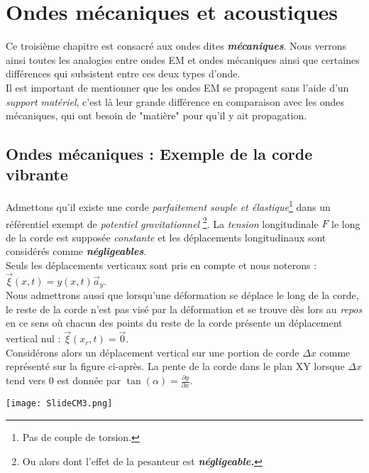 \chapter{Ondes mécaniques et acoustiques} 

Ce troisième chapitre est consacré aux ondes dites \textit{\textbf{mécaniques}}. Nous verrons ainsi toutes les analogies entre ondes EM et ondes mécaniques ainsi que certaines différences qui subsistent entre ces deux types d'onde. \\ 

Il est important de mentionner que les ondes EM se propagent sans l'aide d'un \textit{support matériel}, c'est là leur grande différence en comparaison avec les ondes mécaniques, qui ont besoin de "matière" pour qu'il y ait propagation. 

\section{Ondes mécaniques : Exemple de la corde vibrante}

Admettons qu'il existe une corde \textit{parfaitement souple et élastique}\footnote{Pas de couple de torsion.} dans un référentiel exempt de \textit{potentiel gravitationnel} \footnote{Ou alors dont l'effet de la pesanteur est \textit{\textbf{négligeable.}}}. La \textit{tension} longitudinale $F$ le long de la corde est supposée \textit{constante} et les déplacements longitudinaux sont considérés comme \textit{\textbf{négligeables}}. \\Seuls les déplacements verticaux sont pris en compte et nous noterons : $\vec{\xi}(x,t) = y(x,t) \vec{a}_{y}$.
\\
Nous admettrons aussi que lorsqu'une déformation se déplace le long de la corde, le reste de la corde n'est pas visé par la déformation et se trouve dès lors au \textit{repos} en ce sens où chacun des points du reste de la corde présente un déplacement vertical nul : $\vec{\xi}(x_{r},t) = \vec{0}$. \\

Considérons alors un déplacement vertical sur une portion de corde $\Delta x$ comme représenté sur la figure ci-après.  La pente de la corde dans le plan XY lorsque $\Delta x$ tend vers $0$ est donnée par $\tan (\alpha) = \frac{\partial y}{\partial x}$.

\begin{center}
	\texttt{[image: SlideCM3.png]}
\end{center}

